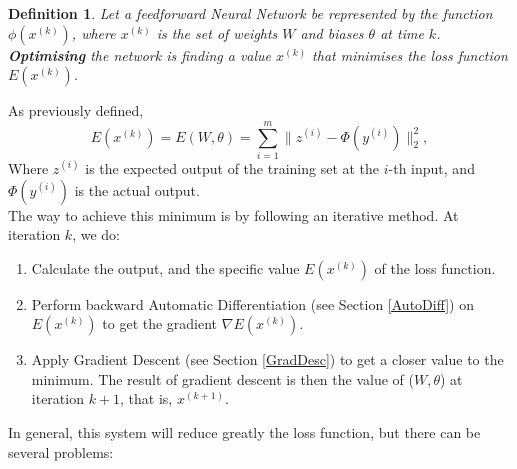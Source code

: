 \documentclass[titlepage]{article}
\theoremstyle{plain}
\newtheorem{definition}{Definition}[section]
\theoremstyle{definition}
\begin{document}
		\begin{definition}
			Let a feedforward Neural Network be represented by the function $\phi(x^{(k)})$, where $x^{(k)}$ is the set of weights $W$ and biases $\theta$ at time $k$. \textbf{Optimising} the network is finding a value $x^{(k)}$ that minimises the loss function $E(x^{(k)})$.
		\end{definition}
		As previously defined, $$E(x^{(k)}) = E(W,\theta) = \sum_{i=1}^m \|z^{(i)} - \Phi(y^{(i)})\|_2^2,$$ Where $z^{(i)}$ is the expected output of the training set at the $i$-th input, and $\Phi(y^{(i)})$ is the actual output.\\
		The way to achieve this minimum is by following an iterative method. At iteration $k$, we do:
		\begin{enumerate}
			\item Calculate the output, and the specific value $E(x^{(k)})$ of the loss function.
			\item Perform backward Automatic Differentiation (see Section \ref{AutoDiff}) on $E(x^{(k)})$ to get the gradient $\nabla E(x^{(k)})$.
			\item Apply Gradient Descent (see Section \ref{GradDesc}) to get a closer value to the minimum. The result of gradient descent is then the value of ($W,\theta$) at iteration $k+1$, that is, $x^{(k+1)}$.
		\end{enumerate}
		In general, this system will reduce greatly the loss function, but there can be several problems:
\end{document}
